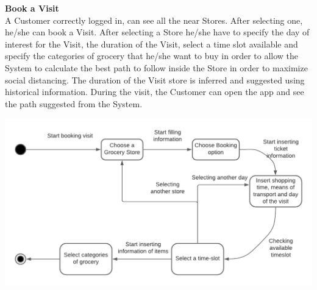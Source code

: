 \documentclass[a4paper, 12pt, oneside]{article}
\begin{document}
\begin{enumerate}
\begin{minipage}{\linewidth}
    \item \textbf{Book a Visit}
    \\
       A Customer correctly logged in, can see all the near Stores. After selecting one, he/she can book a Visit. After selecting a Store he/she have to specify the day of interest for the Visit, the duration of the Visit, select a time slot available and specify the categories of grocery that he/she want to buy in order to allow the System to calculate the best path to follow inside the Store in order to maximize social distancing. The duration of the Visit store is inferred and suggested using historical information.
       During the visit, the Customer can open the app and see the path suggested from the System.
    \\
    \begin{minipage}{\linewidth}
            \centering
          \includegraphics[height=0.3\textheight, scale=0.2, keepaspectratio]{img/Booking_diagram.png}
        \end{minipage}
        

\end{minipage}
\end{enumerate}
\end{document}
